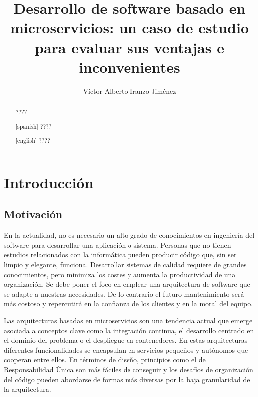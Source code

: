 \documentclass[11pt,spanish,listoffigures,listoftables]{tfgetsinf}
\title{ Desarrollo de software basado en microservicios: un caso de estudio para evaluar sus ventajas e inconvenientes }
\author{Víctor Alberto Iranzo Jiménez}
\begin{document}

\begin{abstract}
????
\end{abstract}
\begin{abstract}[spanish]
????
\end{abstract}
\begin{abstract}[english]
????
\end{abstract}


\mainmatter


\chapter{Introducci\'on}

\section{Motivaci\'on}

En la actualidad, no es necesario un alto grado de conocimientos en ingeniería del software para desarrollar una aplicación o sistema. Personas que no tienen estudios relacionados con la informática pueden producir código que, sin ser limpio y elegante, funciona. Desarrollar sistemas de calidad requiere de grandes conocimientos, pero minimiza los costes y aumenta la productividad de una organización. Se debe poner el foco en emplear una arquitectura de software que se adapte a nuestras necesidades. De lo contrario el futuro mantenimiento será más costoso y repercutirá en la confianza de los clientes y en la moral del equipo.

Las arquitecturas basadas en microservicios son una tendencia actual que emerge asociada a conceptos clave como la integración continua, el desarrollo centrado en el dominio del problema o el despliegue en contenedores. En estas arquitecturas diferentes funcionalidades se encapsulan en servicios pequeños y autónomos que cooperan entre ellos. En términos de diseño, principios como el de Responsabilidad Única son más fáciles de conseguir y los desafíos de organización del código pueden abordarse de formas más diversas por la baja granularidad de la arquitectura. 
\end{document}
